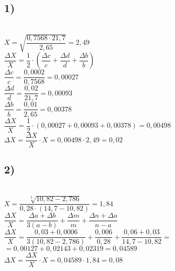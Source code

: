 \documentclass[a4paper, 12pt]{report}
\begin{document}
	\subsection*{1)}
	\\[1ex]
	$X = \sqrt{\dfrac{0,7568 \cdot 21,7}{2,65}} = 2,49$\\[1ex]
	$\dfrac{\varDelta X}{X} = \dfrac{1}{2} \cdot \left( \dfrac{\varDelta c}{c} + \dfrac{\varDelta d}{d} + \dfrac{\varDelta b}{b} \right)$\\[1ex]
	$\dfrac{\varDelta c}{c} = \dfrac{0,0002}{0,7568} = 0,00027$\\[1ex]
	$\dfrac{\varDelta d}{d} = \dfrac{0,02}{21,7} = 0,00093$\\[1ex]
	$\dfrac{\varDelta b}{b} = \dfrac{0,01}{2,65} = 0,00378$\\[1ex]
	$\dfrac{\varDelta X}{X} = \dfrac{1}{2} \cdot \left( 0,00027 + 0,00093 + 0,00378 \right) = 0,00498$\\[1ex]
	$\varDelta X = \dfrac{\varDelta X}{X} \cdot X = 0,00498 \cdot 2,49 = 0,02$\\[1ex]
	\subsection*{2)}
	\\[1ex]
	$X = \dfrac{\sqrt[3]{10,82-2,786}}{0,28 \cdot (14,7-10,82)} = 1,84$\\[1ex]
	$\dfrac{\varDelta X}{X} = \dfrac{\varDelta a + \varDelta b}{3(a-b)} + \dfrac{\varDelta m}{m} + \dfrac{\varDelta n + \varDelta a}{n-a}$\\[1ex]
	$\dfrac{\varDelta X}{X} = \dfrac{0,03 + 0,0006}{3(10,82-2,786)} + \dfrac{0,006}{0,28} + \dfrac{0,06 + 0,03}{14,7-10,82} =$\\[1ex]
	$= 0,00127 + 0,02143 + 0,02319 = 0,04589$\\[1ex]
	$\varDelta X = \dfrac{\varDelta X}{X} \cdot X = 0,04589 \cdot 1,84 = 0,08$\\[1ex]
\end{document}
